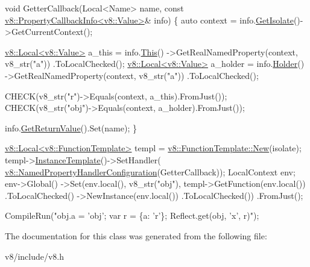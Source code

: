 \begin{DoxyCode}
\textcolor{keywordtype}{void} GetterCallback(Local<Name> name,
                    \textcolor{keyword}{const} \mbox{\hyperlink{classv8_1_1PropertyCallbackInfo}{v8::PropertyCallbackInfo<v8::Value>}}& info) \{
   \textcolor{keyword}{auto} context = info.\mbox{\hyperlink{classv8_1_1PropertyCallbackInfo_aff7b838ede308ab8a42890962eb9271c}{GetIsolate}}()->GetCurrentContext();

   \mbox{\hyperlink{classv8_1_1Local}{v8::Local<v8::Value>}} a\_this =
       info.\mbox{\hyperlink{classv8_1_1PropertyCallbackInfo_af46300339d2f31d8dc84a06d74ed6c3c}{This}}()
           ->GetRealNamedProperty(context, v8\_str(\textcolor{stringliteral}{"a"}))
           .ToLocalChecked();
   \mbox{\hyperlink{classv8_1_1Local}{v8::Local<v8::Value>}} a\_holder =
       info.\mbox{\hyperlink{classv8_1_1PropertyCallbackInfo_a66b7ec267f18bd84e8baf0a0e16187b9}{Holder}}()
           ->GetRealNamedProperty(context, v8\_str(\textcolor{stringliteral}{"a"}))
           .ToLocalChecked();

  CHECK(v8\_str(\textcolor{stringliteral}{"r"})->Equals(context, a\_this).FromJust());
  CHECK(v8\_str(\textcolor{stringliteral}{"obj"})->Equals(context, a\_holder).FromJust());

  info.\mbox{\hyperlink{classv8_1_1PropertyCallbackInfo_aa0882946929c3c4df6d131fe0d8d6746}{GetReturnValue}}().Set(name);
\}

\mbox{\hyperlink{classv8_1_1Local}{v8::Local<v8::FunctionTemplate>}} templ =
\mbox{\hyperlink{classv8_1_1FunctionTemplate_a3b675b8327f08a7c6a4c4d9dce5cb3b3}{v8::FunctionTemplate::New}}(isolate);
templ->\mbox{\hyperlink{classv8_1_1FunctionTemplate_a00dd9725566908e8fd14064542f5a781}{InstanceTemplate}}()->SetHandler(
    \mbox{\hyperlink{structv8_1_1NamedPropertyHandlerConfiguration}{v8::NamedPropertyHandlerConfiguration}}(GetterCallback));
LocalContext env;
env->Global()
    ->Set(env.local(), v8\_str(\textcolor{stringliteral}{"obj"}), templ->GetFunction(env.local())
                                         .ToLocalChecked()
                                         ->NewInstance(env.local())
                                         .ToLocalChecked())
    .FromJust();

CompileRun(\textcolor{stringliteral}{"obj.a = 'obj'; var r = \{a: 'r'\}; Reflect.get(obj, 'x', r)"});
\end{DoxyCode}
 

The documentation for this class was generated from the following file\+:\begin{DoxyCompactItemize}
\item 
v8/include/v8.\+h\end{DoxyCompactItemize}
